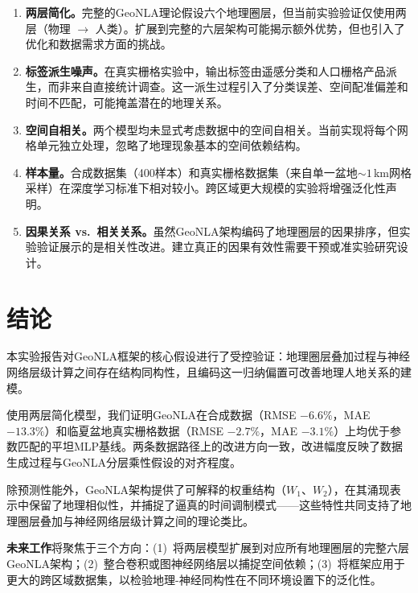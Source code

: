 \documentclass[a4paper,11pt]{article}
\begin{document}
\begin{enumerate}[label=\arabic*.]
    \item \textbf{两层简化。}完整的GeoNLA理论假设六个地理圈层，但当前实验验证仅使用两层（物理 $\to$ 人类）。扩展到完整的六层架构可能揭示额外优势，但也引入了优化和数据需求方面的挑战。

    \item \textbf{标签派生噪声。}在真实栅格实验中，输出标签由遥感分类和人口栅格产品派生，而非来自直接统计调查。这一派生过程引入了分类误差、空间配准偏差和时间不匹配，可能掩盖潜在的地理关系。

    \item \textbf{空间自相关。}两个模型均未显式考虑数据中的空间自相关。当前实现将每个网格单元独立处理，忽略了地理现象基本的空间依赖结构。

    \item \textbf{样本量。}合成数据集（400样本）和真实栅格数据集（来自单一盆地${\sim}1$\,km网格采样）在深度学习标准下相对较小。跨区域更大规模的实验将增强泛化性声明。

    \item \textbf{因果关系 vs.\ 相关关系。}虽然GeoNLA架构编码了地理圈层的因果排序，但实验验证展示的是相关性改进。建立真正的因果有效性需要干预或准实验研究设计。
\end{enumerate}

\section{结论}
\label{sec:conclusion}

本实验报告对GeoNLA框架的核心假设进行了受控验证：地理圈层叠加过程与神经网络层级计算之间存在结构同构性，且编码这一归纳偏置可改善地理人地关系的建模。

使用两层简化模型，我们证明GeoNLA在合成数据（RMSE $-6.6\%$，MAE $-13.3\%$）和临夏盆地真实栅格数据（RMSE $-2.7\%$，MAE $-3.1\%$）上均优于参数匹配的平坦MLP基线。两条数据路径上的改进方向一致，改进幅度反映了数据生成过程与GeoNLA分层乘性假设的对齐程度。

除预测性能外，GeoNLA架构提供了可解释的权重结构（$W_1$、$W_2$），在其涌现表示中保留了地理相似性，并捕捉了逼真的时间调制模式——这些特性共同支持了地理圈层叠加与神经网络层级计算之间的理论类比。

\textbf{未来工作}将聚焦于三个方向：(1)~将两层模型扩展到对应所有地理圈层的完整六层GeoNLA架构；(2)~整合卷积或图神经网络层以捕捉空间依赖；(3)~将框架应用于更大的跨区域数据集，以检验地理-神经同构性在不同环境设置下的泛化性。
\end{document}
